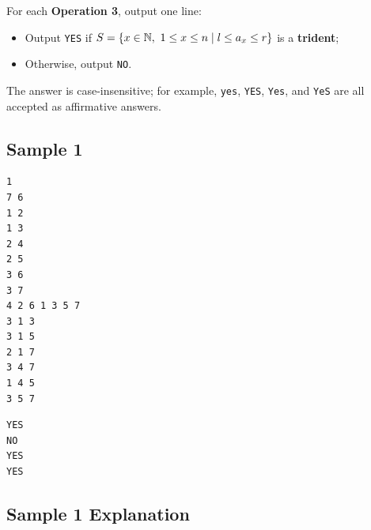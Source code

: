 For each \textbf{Operation 3}, output one line:

\begin{itemize}
	\item Output \texttt{YES} if $S=\{x\in\mathbb{N},\ 1\le x\le n\mid l\le a_x\le r\}$ is a \textbf{trident};
	\item Otherwise, output \texttt{NO}.
\end{itemize}

The answer is case-insensitive; for example, \texttt{yes}, \texttt{YES}, \texttt{Yes}, and \texttt{YeS} are all accepted as affirmative answers.


\subsection{Sample 1}

\begin{minipage}{\linewidth}
\begin{minipage}[t]{0.49\linewidth}
\begin{lstlisting}[title=\texttt{standard input}]
1
7 6
1 2
1 3
2 4
2 5
3 6
3 7
4 2 6 1 3 5 7
3 1 3
3 1 5
2 1 7
3 4 7
1 4 5
3 5 7
\end{lstlisting}
\end{minipage}
\hfill
\begin{minipage}[t]{0.49\linewidth}
\begin{lstlisting}[title=\texttt{standard output}]
YES
NO
YES
YES
\end{lstlisting}
\end{minipage}
\end{minipage}

\subsection{Sample 1 Explanation}

